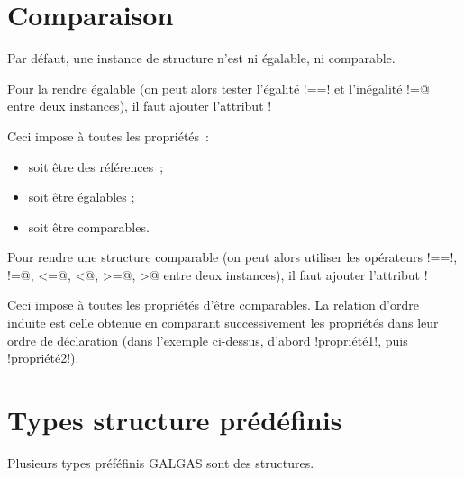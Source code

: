\section{Comparaison}

Par défaut, une instance de structure n'est ni égalable, ni comparable.

Pour la rendre égalable (on peut alors tester l'égalité \ggsq!==! et l'inégalité \ggsq@!=@ entre deux instances), il faut ajouter l'attribut \ggsq!%


Ceci impose à toutes les propriétés~:
\begin{itemize}
  \item soit être des références~;
  \item soit être égalables ;
  \item soit être comparables.
\end{itemize}



Pour rendre une structure comparable (on peut alors utiliser les opérateurs \ggsq!==!, \ggsq@!=@, \ggsq@<=@, \ggsq@<@, \ggsq@>=@, \ggsq@>@ entre deux instances), il faut ajouter l'attribut \ggsq!%


Ceci impose à toutes les propriétés d'être comparables. La relation d'ordre induite est celle obtenue en comparant successivement les propriétés dans leur ordre de déclaration (dans l'exemple ci-dessus, d'abord \ggsq!propriété1!, puis \ggsq!propriété2!).






\section{Types structure prédéfinis}

Plusieurs types préféfinis GALGAS sont des structures.





